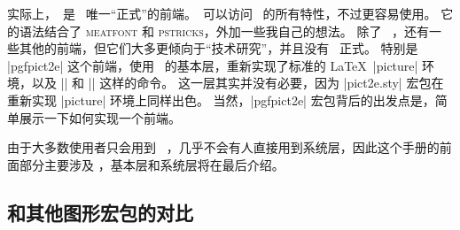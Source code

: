 \begin{onehalfspacing}
实际上，\tikzname\ 是 \pgfname\ 唯一“正式”的前端。\tikzname\ 可以访问 \pgfname\ 的所有特性，不过更容易使用。
它的语法结合了 \textsc{meatfont} 和 \textsc{pstricks}，外加一些我自己的想法。
除了 \tikzname\ ，还有一些其他的前端，但它们大多更倾向于“技术研究”，并且没有 \tikzname\ 正式。
特别是 |pgfpict2e| 这个前端，使用 \pgfname\ 的基本层，重新实现了标准的 \LaTeX\ |{picture}| 环境，以及 |\line| 和 |\vector| 这样的命令。
这一层其实并没有必要，因为 |pict2e.sty| 宏包在重新实现 |{picture}| 环境上同样出色。
当然，|pgfpict2e| 宏包背后的出发点是，简单展示一下如何实现一个前端。

由于大多数使用者只会用到 \tikzname\ ，几乎不会有人直接用到系统层，因此这个手册的前面部分主要涉及 \tikzname，基本层和系统层将在最后介绍。

\end{onehalfspacing}


\subsection{和其他图形宏包的对比}

